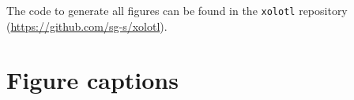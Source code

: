 \documentclass[utf8]{frontiersSCNS} %
\begin{document}
The code to generate all figures can be found in the \texttt{xolotl} repository (\url{https://github.com/sg-s/xolotl}).




\section*{Figure captions}

\end{document}
